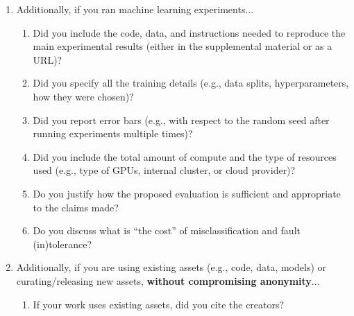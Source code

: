 \documentclass[letterpaper]{article} %
\begin{document}
\begin{enumerate}
\begin{enumerate}

  \item Did you include complete proofs of all theoretical results?
    
\end{enumerate}

\item Additionally, if you ran machine learning experiments...
\begin{enumerate}
  \item Did you include the code, data, and instructions needed to reproduce the main experimental results (either in the supplemental material or as a URL)?
    

  \item Did you specify all the training details (e.g., data splits, hyperparameters, how they were chosen)?
    

  \item Did you report error bars (e.g., with respect to the random seed after running experiments multiple times)?
    

  \item Did you include the total amount of compute and the type of resources used (e.g., type of GPUs, internal cluster, or cloud provider)?
    

  \item Do you justify how the proposed evaluation is sufficient and appropriate to the claims made?
    

  \item Do you discuss what is ``the cost'' of misclassification and fault (in)tolerance?
    
\end{enumerate}

\item Additionally, if you are using existing assets (e.g., code, data, models) or curating/releasing new assets, \textbf{without compromising anonymity}...
\begin{enumerate}
  \item If your work uses existing assets, did you cite the creators?
    

\end{enumerate}
\end{enumerate}
\end{document}
